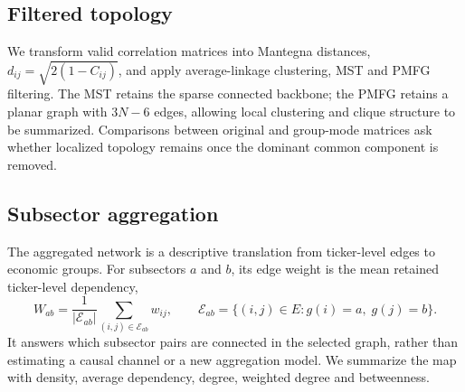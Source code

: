 \subsection{Filtered topology}
\label{subsec:distance_clustering_method}

We transform valid correlation matrices into Mantegna distances, $d_{ij}=\sqrt{2(1-C_{ij})}$, and apply average-linkage clustering, MST and PMFG filtering. The MST retains the sparse connected backbone; the PMFG retains a planar graph with $3N-6$ edges, allowing local clustering and clique structure to be summarized. Comparisons between original and group-mode matrices ask whether localized topology remains once the dominant common component is removed.
\label{subsec:network_method}

\subsection{Subsector aggregation}
\label{subsec:subsector_network_method}

The aggregated network is a descriptive translation from ticker-level edges to economic groups. For subsectors $a$ and $b$, its edge weight is the mean retained ticker-level dependency,
\begin{equation}
W_{ab}=\frac{1}{|\mathcal{E}_{ab}|}\sum_{(i,j)\in\mathcal{E}_{ab}} w_{ij},
\qquad
\mathcal{E}_{ab}=\{(i,j)\in E:g(i)=a,\;g(j)=b\}.
\end{equation}
It answers which subsector pairs are connected in the selected graph, rather than estimating a causal channel or a new aggregation model. We summarize the map with density, average dependency, degree, weighted degree and betweenness.
